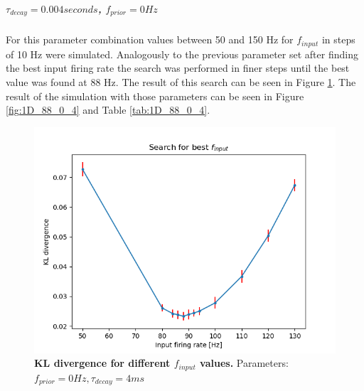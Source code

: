\subparagraph{$\tau_{decay} = 0.004 seconds$, $f_{prior} = 0 Hz$}
For this parameter combination values between 50 and 150 Hz for $f_{input}$ in steps of 10 Hz were simulated. Analogously to the previous parameter set after finding the best input firing rate the search was performed in finer steps until the best value was found at 88 Hz. The result of this search can be seen in Figure \ref{fig:1D_KLD_fPrior0_tau4}. The result of the simulation with those parameters can be seen in Figure \ref{fig:1D_88_0_4} and Table \ref{tab:1D_88_0_4}.

\begin{figure}
  \includegraphics[width=\linewidth]{figures/1D/KLDvsfInput_fPrior0tau4.png}
  \caption{\textbf{KL divergence for different $f_{input}$ values.} Parameters: $f_{prior} = 0 Hz, \tau_{decay} = 4 ms$}
  \label{fig:1D_KLD_fPrior0_tau4}
\end{figure}

